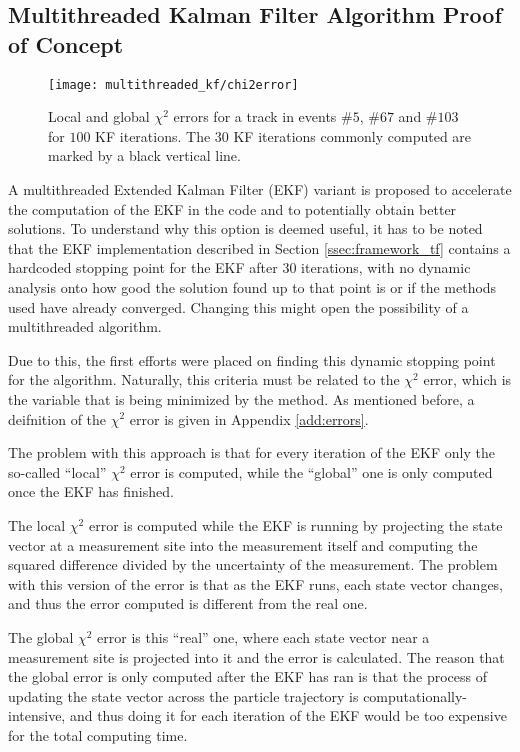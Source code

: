 \subsection{Multithreaded Kalman Filter Algorithm Proof of Concept} \label{ssec:prop_multithreaded_kf}

    \begin{wrapfigure}{r}{0.51\textwidth}
        \centering
        \texttt{[image: multithreaded\_kf/chi2error]}
        \caption{\label{fig:mkf_chi2error} Local and global $\chi^2$ errors for a track in events \#$5$, \#$67$ and \#$103$ for $100$ KF iterations. The $30$ KF iterations commonly computed are marked by a black vertical line.}
    \end{wrapfigure}

A multithreaded Extended Kalman Filter (EKF) variant is proposed to accelerate the computation of the EKF in the code and to potentially obtain better solutions.
To understand why this option is deemed useful, it has to be noted that the EKF implementation described in Section \ref{ssec:framework_tf} contains a hardcoded stopping point for the EKF after $30$ iterations, with no dynamic analysis onto how good the solution found up to that point is or if the methods used have already converged.
Changing this might open the possibility of a multithreaded algorithm.

Due to this, the first efforts were placed on finding this dynamic stopping point for the algorithm.
Naturally, this criteria must be related to the $\chi^2$ error, which is the variable that is being minimized by the method.
As mentioned before, a deifnition of the $\chi^2$ error is given in Appendix \ref{add:errors}.

The problem with this approach is that for every iteration of the EKF only the so-called ``local'' $\chi^2$ error is computed, while the ``global'' one is only computed once the EKF has finished.

The local $\chi^2$ error is computed while the EKF is running by projecting the state vector at a measurement site into the measurement itself and computing the squared difference divided by the uncertainty of the measurement.
The problem with this version of the error is that as the EKF runs, each state vector changes, and thus the error computed is different from the real one.

The global $\chi^2$ error is this ``real'' one, where each state vector near a measurement site is projected into it and the error is calculated.
The reason that the global error is only computed after the EKF has ran is that the process of updating the state vector across the particle trajectory is computationally-intensive, and thus doing it for each iteration of the EKF would be too expensive for the total computing time.

